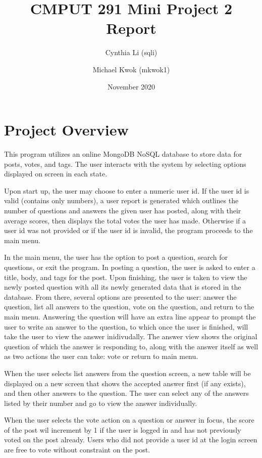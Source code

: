 \documentclass{article}
\title{CMPUT 291 Mini Project 2 Report}
\date{November 2020}
\author{Cynthia Li (sqli)\\
\and Michael Kwok (mkwok1)}
\begin{document}
\maketitle

\section{Project Overview}

This program utilizes an online MongoDB NoSQL database to store data for posts, votes, and tags. The user interacts with the system by selecting options displayed on screen in each state.

Upon start up, the user may choose to enter a numeric user id. If the user id is valid (contains only numbers), a user report is generated which outlines the number of questions and answers the given user has posted, along with their average scores, then displays the total votes the user has made. Otherwise if a user id was not provided or if the user id is invalid, the program proceeds to the main menu.

In the main menu, the user has the option to post a question, search for questions, or exit the program. In posting a question, the user is asked to enter a title, body, and tags for the post. Upon finishing, the user is taken to view the newly posted question with all its newly generated data that is stored in the database. From there, several options are presented to the user: answer the question, list all answers to the question, vote on the question, and return to the main menu. Answering the question will have an extra line appear to prompt the user to write an answer to the question, to which once the user is finished, will take the user to view the answer inidivudally. The answer view shows the original question of which the answer is responding to, along with the answer itself as well as two actions the user can take: vote or return to main menu.

When the user selects list answers from the question screen, a new table will be displayed on a new screen that shows the accepted answer first (if any exists), and then other answers to the question. The user can select any of the answers listed by their number and go to view the answer individually.

When the user selects the vote action on a question or answer in focus, the score of the post wil increment by 1 if the user is logged in and has not previously voted on the post already. Users who did not provide a user id at the login screen are free to vote without constraint on the post.
\end{document}
